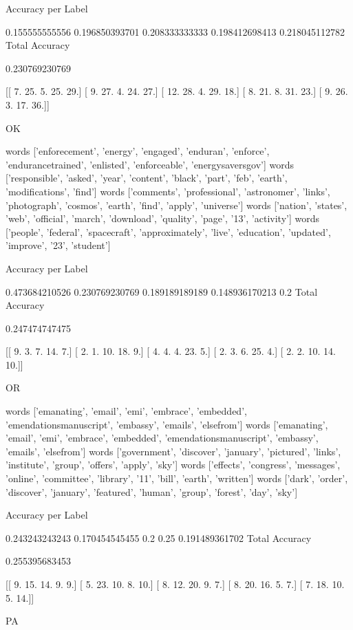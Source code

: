 \documentclass[11pt]{article}
\begin{document}
\begin{verbatium}
Accuracy per Label

0.155555555556
0.196850393701
0.208333333333
0.198412698413
0.218045112782
Total Accuracy

0.230769230769


[[  7.  25.   5.  25.  29.]
 [  9.  27.   4.  24.  27.]
 [ 12.  28.   4.  29.  18.]
 [  8.  21.   8.  31.  23.]
 [  9.  26.   3.  17.  36.]]


OK


words
['enforecement', 'energy', 'engaged', 'enduran', 'enforce', 'endurancetrained', 'enlisted', 'enforceable', 'energysaversgov']
words
['responsible', 'asked', 'year', 'content', 'black', 'part', 'feb', 'earth', 'modifications', 'find']
words
['comments', 'professional', 'astronomer', 'links', 'photograph', 'cosmos', 'earth', 'find', 'apply', 'universe']
words
['nation', 'states', 'web', 'official', 'march', 'download', 'quality', 'page', '13', 'activity']
words
['people', 'federal', 'spacecraft', 'approximately', 'live', 'education', 'updated', 'improve', '23', 'student']

Accuracy per Label

0.473684210526
0.230769230769
0.189189189189
0.148936170213
0.2
Total Accuracy

0.247474747475


[[  9.   3.   7.  14.   7.]
 [  2.   1.  10.  18.   9.]
 [  4.   4.   4.  23.   5.]
 [  2.   3.   6.  25.   4.]
 [  2.   2.  10.  14.  10.]]


OR


words
['emanating', 'email', 'emi', 'embrace', 'embedded', 'emendationsmanuscript', 'embassy', 'emails', 'elsefrom']
words
['emanating', 'email', 'emi', 'embrace', 'embedded', 'emendationsmanuscript', 'embassy', 'emails', 'elsefrom']
words
['government', 'discover', 'january', 'pictured', 'links', 'institute', 'group', 'offers', 'apply', 'sky']
words
['effects', 'congress', 'messages', 'online', 'committee', 'library', '11', 'bill', 'earth', 'written']
words
['dark', 'order', 'discover', 'january', 'featured', 'human', 'group', 'forest', 'day', 'sky']

Accuracy per Label

0.243243243243
0.170454545455
0.2
0.25
0.191489361702
Total Accuracy

0.255395683453


[[  9.  15.  14.   9.   9.]
 [  5.  23.  10.   8.  10.]
 [  8.  12.  20.   9.   7.]
 [  8.  20.  16.   5.   7.]
 [  7.  18.  10.   5.  14.]]


PA



\end{verbatium}
\end{document}
